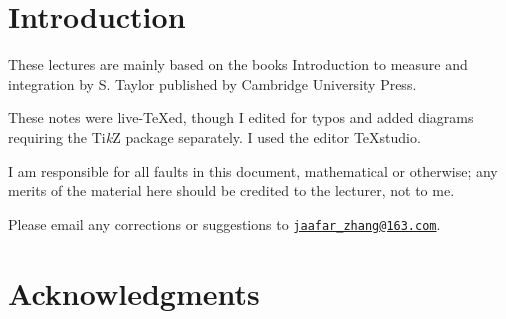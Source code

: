 \documentclass[11pt]{article}
\author{Lectures by \lecturer\\ \text{} \\ Notes by \notetaker}
\title{\coursetitle}
\date{\institution, \courseterm}
\makeatletter
\newcommand{\notetakersemail}{jaafar\_zhang@163.com}
\newcounter{lecture} \setcounter{lecture}{0}
\theoremstyle{definition}
\numberwithin{equation}{lecture}
\makeatother
\begin{document}
%
%
%


%
\maketitle
{}
\thispagestyle{empty}
\setcounter{page}{-1}
\vspace{0.3in}



%
\begin{center}
\begin{minipage}[t]{0.9\textwidth}
\begin{multicols}{2}
\tableofcontents
\end{multicols}
\end{minipage}
\end{center}



\newpage
\thispdfpagelabel{-}
\thispagestyle{empty}



%
\section*{Introduction}
These lectures are mainly based on the books Introduction to measure and integration by S. Taylor published by Cambridge University Press.

These notes were live-TeXed, though I edited for typos and added diagrams requiring the Ti\textit{k}Z package separately. I used the editor TeXstudio.

I am responsible for all faults in this document, mathematical or otherwise; any merits of the material here should be credited to the lecturer, not to me.

Please email any corrections or suggestions to \expandafter\href{mailto:\notetakersemail}{\texttt{\notetakersemail}}.

\medskip

\section*{Acknowledgments}
\end{document}
